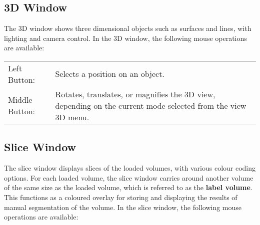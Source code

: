 \subsection{3D Window}

The 3D window shows three dimensional objects such as surfaces and
lines, with lighting and camera control.  In the 3D window, the following
mouse operations are available:

\vspace{.5cm}
\begin{tabular}[t]{p{3cm}p{7cm}}
Left Button:  &  Selects a position on an object. \\
Middle Button:  &  Rotates, translates, or magnifies the 3D view, depending
                      on the current mode selected from the view 3D menu.
\end{tabular}

\subsection{Slice Window}

The slice window displays slices of the loaded volumes, with various
colour coding
options.  For each loaded volume, the slice window carries around another
volume of the same size as the loaded volume, which is referred to as the
{\bf label volume}.
This functions as a coloured overlay for storing and displaying the results
of manual segmentation of the volume.
In the slice window, the following mouse operations are available:

\vspace{.5cm}


